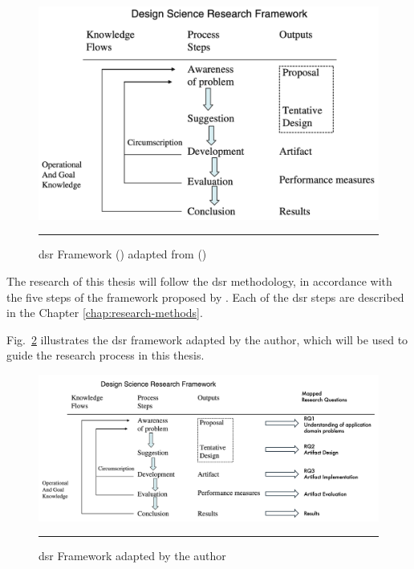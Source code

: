 \begin{figure}[htbp]
    \centering
 \includegraphics[width=.9\textwidth]{03_Figures/research-methods/design-science-research-framework.png}
     \rule{35em}{0.5pt}
    \caption{\acrlong{dsr} Framework (\textcite{Hevner2010}) adapted from (\textcite{Vaishnavi2007})} 
 \label{fig:design-science-research-framework}
\end{figure}

The research of this thesis will follow the \gls{dsr} methodology, in accordance with the five steps of the framework proposed by \textcite{Hevner2010}.
Each of the \gls{dsr} steps are described in the Chapter \ref{chap:research-methods}.


Fig.~\ref{fig:design-science-research-framework-adapted-by-author} illustrates the \gls{dsr} framework adapted by the author, which will be used to guide the research process in this thesis.
\begin{figure}[htbp]
    \centering
 \includegraphics[width=.9\textwidth]{03_Figures/research-methods/design-science-research-framework-by-author.png}
     \rule{35em}{0.5pt}
    \caption{\acrlong{dsr} Framework adapted by the author} 
 \label{fig:design-science-research-framework-adapted-by-author}
\end{figure}

